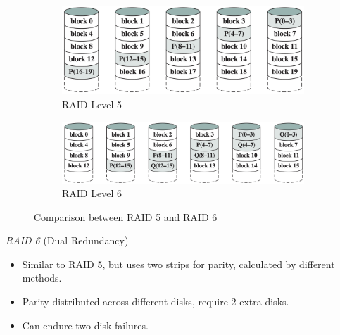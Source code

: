 \begin{figure}[H]
    \centering
    \hfill
    \begin{subfigure}{0.4\textwidth}
        \centering
        \includegraphics[width=\textwidth]{chaps/memory/external-memory/raid-level-5.png}
        \caption{RAID Level 5}
    \end{subfigure}
    \hfill
    \begin{subfigure}{0.5\textwidth}
        \centering
        \includegraphics[width=\textwidth]{chaps/memory/external-memory/raid-level-6.png}
        \caption{RAID Level 6}
    \end{subfigure}
    \hfill
    \caption{Comparison between RAID 5 and RAID 6}
\end{figure}

\emph{RAID 6} {\normalfont\large (Dual Redundancy)}

\begin{itemize}
    \item Similar to RAID 5, but uses two strips for parity, calculated by different methods.
    \item Parity distributed across different disks, require 2 extra disks.
    \item Can endure two disk failures.
\end{itemize}